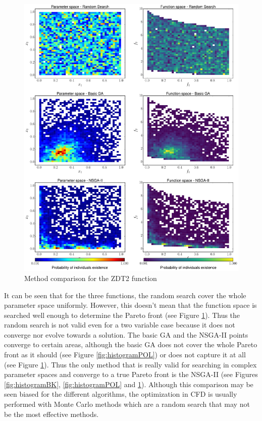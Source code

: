     \begin{figure}[H]
        \centering
        \includegraphics[height=0.96\textheight, width=\textwidth]{Figures/3/hist_ZDT2.pdf}
        \caption{Method comparison for the ZDT2 function}
        \label{fig:histogramZDT2}
    \end{figure}
    
\newpage

It can be seen that for the three functions, the random search cover the whole parameter space uniformly. However, this doesn't mean that the function space is searched well enough to determine the Pareto front (see Figure \ref{fig:histogramZDT2}). Thus the random search is not valid even for a two variable case because it does not converge nor evolve towards a solution. The basic GA and the NSGA-II points converge to certain areas, although the basic GA does not cover the whole Pareto front as it should (see Figure \ref{fig:histogramPOL}) or does not capture it at all (see Figure \ref{fig:histogramZDT2}). Thus the only method that is really valid for searching in complex parameter spaces and converge to a true Pareto front is the NSGA-II (see Figures \ref{fig:histogramBK}, \ref{fig:histogramPOL} and \ref{fig:histogramZDT2}). Although this comparison may be seen biased for the different algorithms, the optimization in CFD is usually performed with Monte Carlo methods which are a random search that may not be the most effective methods. 

